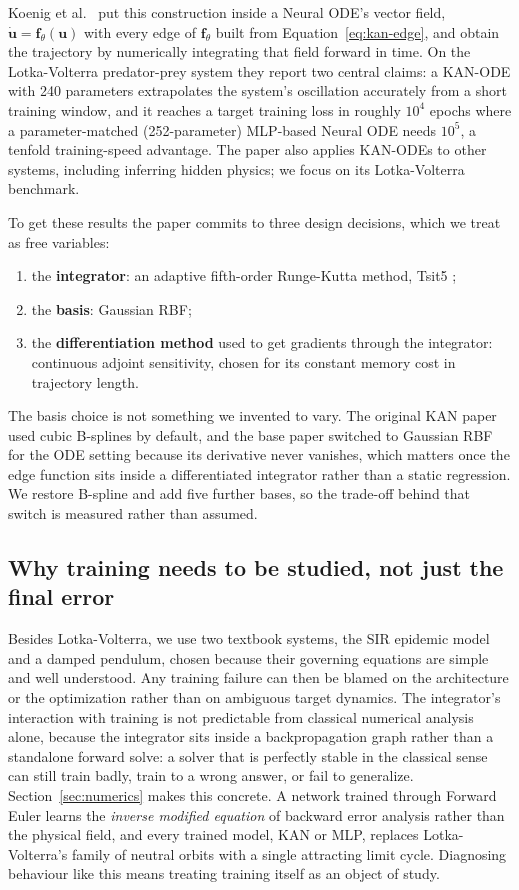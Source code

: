 Koenig et al.\ \cite{Koenig_2024} put this construction inside a Neural
ODE's vector field, $\dot{\mathbf{u}}=\mathbf{f}_\theta(\mathbf{u})$ with
every edge of $\mathbf{f}_\theta$ built from Equation~\ref{eq:kan-edge}, and
obtain the trajectory by numerically integrating that field forward in time.
On the Lotka-Volterra predator-prey system they report two central claims:
a KAN-ODE with 240 parameters extrapolates the system's oscillation
accurately from a short training window, and it reaches a target training
loss in roughly $10^4$ epochs where a parameter-matched (252-parameter)
MLP-based Neural ODE needs $10^5$, a tenfold training-speed advantage. The
paper also applies KAN-ODEs to other systems, including inferring hidden
physics; we focus on its Lotka-Volterra benchmark.

To get these results the paper commits to three design decisions, which we
treat as free variables:
\begin{enumerate}
\item the \textbf{integrator}: an adaptive fifth-order Runge-Kutta method,
  Tsit5 \cite{tsitouras2011tsit5};
\item the \textbf{basis}: Gaussian RBF;
\item the \textbf{differentiation method} used to get gradients through the
  integrator: continuous adjoint sensitivity, chosen for its constant memory
  cost in trajectory length.
\end{enumerate}
The basis choice is not something we invented to vary. The original KAN
paper \cite{liu2024kan} used cubic B-splines by default, and the base paper
switched to Gaussian RBF for the ODE setting because its derivative never
vanishes, which matters once the edge function sits inside a differentiated
integrator rather than a static regression. We restore B-spline and add five
further bases, so the trade-off behind that switch is measured rather than
assumed.

\subsection{Why training needs to be studied, not just the final error}

Besides Lotka-Volterra, we use two textbook systems, the SIR epidemic model
and a damped pendulum, chosen because their governing equations are simple
and well understood. Any training failure can then be blamed on the
architecture or the optimization rather than on ambiguous target dynamics.
The integrator's interaction with training is not predictable from classical
numerical analysis alone, because the integrator sits inside a
backpropagation graph rather than a standalone forward solve: a solver that
is perfectly stable in the classical sense can still train badly, train to a
wrong answer, or fail to generalize. Section~\ref{sec:numerics} makes this
concrete. A network trained through Forward Euler learns the \emph{inverse
modified equation} of backward error analysis rather than the physical
field, and every trained model, KAN or MLP, replaces Lotka-Volterra's family
of neutral orbits with a single attracting limit cycle. Diagnosing behaviour
like this means treating training itself as an object of study.

